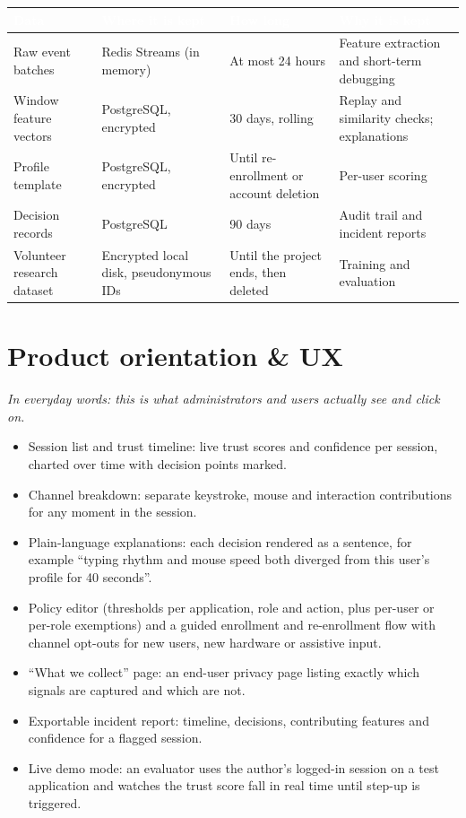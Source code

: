 \documentclass[10pt,letterpaper]{article}
\newcommand{\hd}[1]{\textcolor{white}{\bfseries #1}}
\newcommand{\headrow}{\rowcolor{navy}}
\begin{document}
\begin{xltabular}{\textwidth}{P{3.6cm} P{3.8cm} P{3.1cm} L}
\headrow \hd{Data} & \hd{Where it is kept} & \hd{How long} & \hd{Why it is kept} \\
\endhead
Raw event batches & Redis Streams (in memory) & At most 24 hours & Feature extraction and short-term debugging \\ \hline
Window feature vectors & PostgreSQL, encrypted & 30 days, rolling & Replay and similarity checks; explanations \\ \hline
Profile template & PostgreSQL, encrypted & Until re-enrollment or account deletion & Per-user scoring \\ \hline
Decision records & PostgreSQL & 90 days & Audit trail and incident reports \\ \hline
Volunteer research dataset & Encrypted local disk, pseudonymous IDs & Until the project ends, then deleted & Training and evaluation \\
\end{xltabular}

\section{Product orientation \& UX}

\emph{In everyday words: this is what administrators and users actually see and click on.}

\begin{itemize}
  \item Session list and trust timeline: live trust scores and confidence per session, charted over time with decision points marked.
  \item Channel breakdown: separate keystroke, mouse and interaction contributions for any moment in the session.
  \item Plain-language explanations: each decision rendered as a sentence, for example ``typing rhythm and mouse speed both diverged from this user's profile for 40 seconds''.
  \item Policy editor (thresholds per application, role and action, plus per-user or per-role exemptions) and a guided enrollment and re-enrollment flow with channel opt-outs for new users, new hardware or assistive input.
  \item ``What we collect'' page: an end-user privacy page listing exactly which signals are captured and which are not.
  \item Exportable incident report: timeline, decisions, contributing features and confidence for a flagged session.
  \item Live demo mode: an evaluator uses the author's logged-in session on a test application and watches the trust score fall in real time until step-up is triggered.
\end{itemize}
\end{document}
